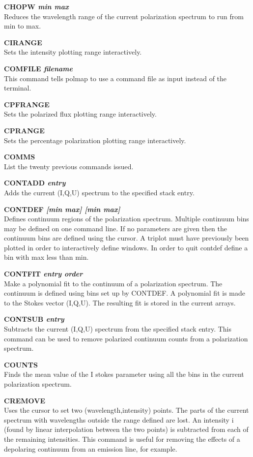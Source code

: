 {\bf CHOPW \it min max} \\
Reduces the wavelength range of the current polarization spectrum to run from
min to  max.

{\bf CIRANGE} \\
Sets the intensity plotting range interactively.

{\bf COMFILE \it filename} \\
This command tells  polmap to use a command file as input instead of the
terminal. 

{\bf CPFRANGE} \\
Sets the polarized flux plotting range interactively.

{\bf CPRANGE} \\
Sets the percentage polarization plotting range interactively.

{\bf COMMS} \\
List the twenty previous commands issued.

{\bf CONTADD \it entry} \\
Adds the current (I,Q,U) spectrum to the specified stack entry.

{\bf CONTDEF \it  [min max] [min max] } \\
Defines continuum regions of the polarization spectrum. Multiple continuum bins
may be defined on one command line. If no parameters are given then the
continuum bins are defined using the cursor. A triplot must have previously
been plotted in order to interactively define windows. In order to quit contdef
define a bin with  max less than  min.

{\bf CONTFIT \it entry order } \\
Make a polynomial fit to the continuum of a polarization spectrum. The
continuum is defined using bins set up by  CONTDEF. A polynomial fit is
made to the Stokes vector (I,Q,U). The resulting fit is stored in the
current arrays.

{\bf CONTSUB \it entry  } \\
Subtracts the current (I,Q,U) spectrum from the specified stack entry. This
command can be used to remove polarized continuum counts from a polarization
spectrum.

{\bf COUNTS} \\
Finds the mean value of the I stokes parameter using all the bins in the
current polarization spectrum.

{\bf CREMOVE} \\
Uses the cursor to set two (wavelength,intensity) points. The parts of
the current spectrum with wavelengths outside the range defined are
lost. An intensity i (found by linear interpolation between the two
points) is subtracted from each of the remaining intensities. This
command is useful for removing the effects of a depolaring continuum
from an emission line, for example.


